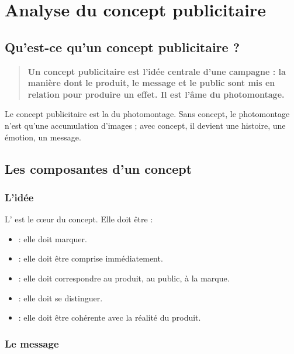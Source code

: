 \section{Analyse du concept publicitaire}

\subsection{Qu'est-ce qu'un concept publicitaire ?}

\begin{quote}
\textbf{Un concept publicitaire est l'idée centrale d'une campagne : la manière dont le produit, le message et le public sont mis en relation pour produire un effet. Il est l'âme du photomontage.}
\end{quote}

Le concept publicitaire est la  du photomontage. Sans concept, le photomontage n'est qu'une accumulation d'images ; avec concept, il devient une histoire, une émotion, un message.

\subsection{Les composantes d'un concept}

\subsubsection{L'idée}

L' est le cœur du concept. Elle doit être :

\begin{itemize}
    \item {} : elle doit marquer.
    \item {} : elle doit être comprise immédiatement.
    \item {} : elle doit correspondre au produit, au public, à la marque.
    \item {} : elle doit se distinguer.
    \item {} : elle doit être cohérente avec la réalité du produit.
\end{itemize}

\subsubsection{Le message}

